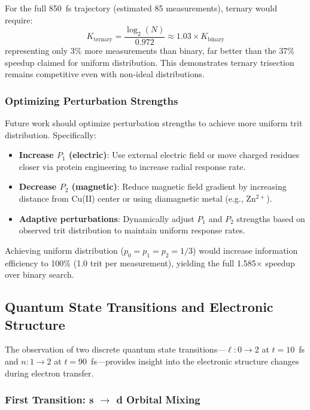 \documentclass[twocolumn,10pt]{article}
\begin{document}
For the full 850~fs trajectory (estimated 85 measurements), ternary would require:
%
\begin{equation}
K_{\text{ternary}} = \frac{\log_2(N)}{0.972} \approx 1.03 \times K_{\text{binary}}
\label{eq:ternary_iterations_corrected}
\end{equation}
%
representing only 3\% more measurements than binary, far better than the 37\% 
speedup claimed for uniform distribution. This demonstrates ternary trisection 
remains competitive even with non-ideal distributions.

\subsubsection{Optimizing Perturbation Strengths}

Future work should optimize perturbation strengths to achieve more uniform trit 
distribution. Specifically:
%
\begin{itemize}
\item \textbf{Increase $P_1$ (electric)}: Use external electric field or move 
charged residues closer via protein engineering to increase radial response rate.

\item \textbf{Decrease $P_2$ (magnetic)}: Reduce magnetic field gradient by 
increasing distance from Cu(II) center or using diamagnetic metal (e.g., Zn$^{2+}$).

\item \textbf{Adaptive perturbations}: Dynamically adjust $P_1$ and $P_2$ 
strengths based on observed trit distribution to maintain uniform response rates.
\end{itemize}

Achieving uniform distribution ($p_0 = p_1 = p_2 = 1/3$) would increase 
information efficiency to 100\% (1.0 trit per measurement), yielding the full 
1.585× speedup over binary search.

\subsection{Quantum State Transitions and Electronic Structure}

The observation of two discrete quantum state transitions—$\ell: 0 \to 2$ at 
$t = 10$~fs and $n: 1 \to 2$ at $t = 90$~fs—provides insight into the electronic 
structure changes during electron transfer.

\subsubsection{First Transition: \texorpdfstring{s $\to$ d}{s to d} Orbital Mixing}
\end{document}
